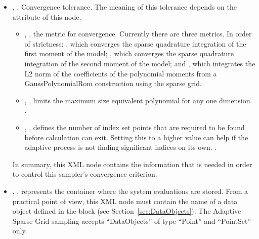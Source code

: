 \begin{itemize}
  \item {}, , Convergence
    tolerance.
    The meaning of this tolerance depends on the  attribute of this node.
    \begin{itemize}
      \item {}, , the metric for convergence.
        Currently there are three metrics.  In order of strictness: , which converges the sparse
        quadrature integration of the first moment of the model; , which
        converges the sparse quadrature integration of the second moment of the model; and
        , which integrates the L2 norm of the coefficients of the polynomial
        moments from a GaussPolynomialRom construction using the sparse grid.
      \item {}, ,
        limits the maximum size equivalent polynomial for any one dimension.
        .
      \item {}, , defines the number of
        index set points that are required to be found before calculation can exit.  Setting this to a higher
        value can help if the adaptive process is not finding significant indices on its own.
        .
    \end{itemize}
    In summary, this XML node contains the information that is needed in order
    to control this sampler's convergence criterion.
\end{itemize}
        \begin{itemize}
      \item {}, ,
        represents the container where the system evaluations are stored.
        From a practical point of view, this XML node must contain the name of
        a data object defined in the  block (see
        Section~\ref{sec:DataObjects}).
        The Adaptive Sparse Grid sampling accepts ``DataObjects'' of type ``Point'' and
        ``PointSet'' only.
\end{itemize}

